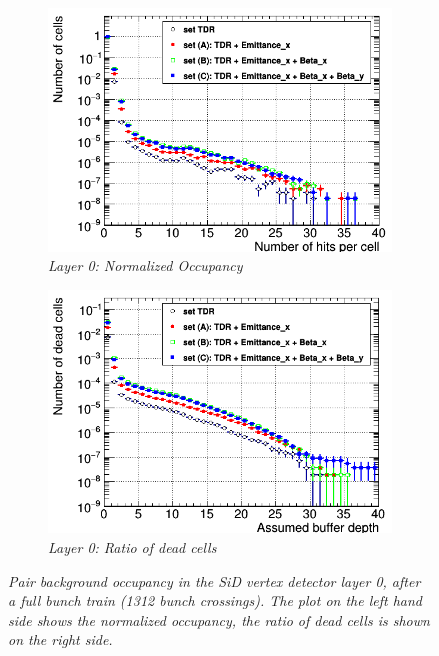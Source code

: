\begin{figure}[h!]
\centering
\begin{subfigure}[t]{0.45\textwidth}
\centering
\includegraphics[width=1.05\textwidth]{figures/Occupancy_Comparison_Layer_0_numcells_ILC250_Comparison_ALL_SETS_5T_w_antiDiD_LEG.png}
\caption{\textit{Layer 0: Normalized Occupancy}}
\end{subfigure}
\hspace*{0.3cm}
\begin{subfigure}[t]{0.45\textwidth}
\centering
\includegraphics[width=1.05\textwidth]{figures/Occupancy_Comparison_Layer_0_deadcells_ILC250_Comparison_ALL_SETS_5T_w_antiDiD_LEG.png}
\caption{\textit{Layer 0: Ratio of dead cells}}
\end{subfigure}
\caption{\textit{Pair background occupancy in the SiD vertex detector layer 0, after a full bunch train (1312 bunch crossings).
The plot on the left hand side shows the normalized occupancy, the ratio of dead cells is shown on the right side.}}
\label{fig:Layer0_Occupancy}
\end{figure}

